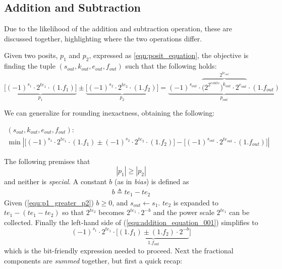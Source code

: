 \subsection{Addition and Subtraction}\label{Addition_and_Subtraction}

Due to the likelihood of the addition and subtraction operation, these are discussed together, highlighting where the two operations differ.


Given two posits, $p_1$ and $p_2$, expressed as \eqref{eqn:posit_equation}, the objective is finding the tuple $(s_{out}, k_{out}, e_{out}, f_{out})$ such that the following holds:
\begin{equation}\label{equ:addition_equation_001}
    \underbrace{\big[ (-1)^{s_1} \cdot 2^{te_1} \cdot (1.f_1) \big]}_{p_1} \pm \underbrace{\big[ (-1)^{s_2} \cdot 2^{te_2} \cdot (1.f_2) \big]}_{p_2} = \underbrace{ (-1)^{s_{out}} \cdot \overbrace{\big(2^{2^{esbits}}\big)^{k_{out}} \cdot 2^{e_{out}}}^{2^{te_{out}}} \cdot (1.f_{out})}_{p_{out}}
\end{equation}

We can generalize for rounding inexactness, obtaining the following:

\begin{equation}
\begin{gathered}
    (s_{out}, k_{out}, e_{out}, f_{out}): \\
    \min | \big[ (-1)^{s_1} \cdot 2^{te_1} \cdot (1.f_1) \pm (-1)^{s_2} \cdot 2^{te_2} \cdot (1.f_2) \big] - \big[ (-1)^{s_{out}} \cdot 2^{te_{out}} \cdot (1.f_{out}) \big] |
\end{gathered}
\end{equation}


The following premises that
\begin{equation}\label{equ:p1_greater_p2}
|p_1| \ge |p_2|
\end{equation}
and neither is \textit{special}.
A constant $b$ (as in \textit{bias}) is defined as
\begin{equation}\label{equ:b_bias}
\begin{aligned}
b \triangleq te_1 - te_2
\end{aligned}
\end{equation}
Given (\ref{equ:p1_greater_p2}) $b \ge 0$, and $s_{out} \leftarrow s_1$. $te_2$ is expanded to $te_1 - (te_1 - te_2)$ so that $2^{te_2}$ becomes $2^{te_1} \cdot 2^{-b}$ and the power scale $2^{te_1}$ can be collected. Finally the left-hand side of (\ref{equ:addition_equation_001}) simplifies to
\begin{equation}
(-1)^{s_1} \cdot 2^{te_1} \cdot \big[ \underbrace{(1.f_1) \pm (1.f_2) \cdot 2^{-b}}_{1.f_{out}}\big]
\end{equation}
which is the bit-friendly expression needed to proceed.
Next the fractional components are \textit{summed} together, but first a quick recap:

